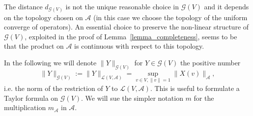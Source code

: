 \documentclass{article}
\newcommand{\assign}{:=}
\begin{document}
\begin{remark}
  The distance $d_{\mathcal{G} (V)}$ is not the unique reasonable choice in
  $\mathcal{G} (V)$ and it depends on the topology chosen on $\mathcal{A}$ (in
  this case we choose the topology of the uniform converge of operators). An
  essential choice to preserve the non-linear structure of $\mathcal{G} (V)$,
  exploited in the proof of Lemma~\ref{lemma_completeness}, seems to be that
  the product on $\mathcal{A}$ is continuous with respect to this topology. 
\end{remark}

In the following we will denote $\| Y \|_{\mathcal{G} (V)}$ for $Y \in
\mathcal{G} (V)$ the positive number
\[ \| Y \|_{\mathcal{G} (V)} \assign \| Y \|_{\mathcal{L} (V, \mathcal{A})} =
   \sup_{v \in V, \| v \| = 1} \| X (v) \|_{\mathcal{A}}, \]
i.e. the norm of the restriction of $Y$ to $\mathcal{L} (V, \mathcal{A})$.
This is useful to formulate a Taylor formula on $\mathcal{G} (V)$. We will sue
the simpler notation $m$ for the multiplication $m_{\mathcal{A}}$ in
$\mathcal{A}$.

\
\end{document}
